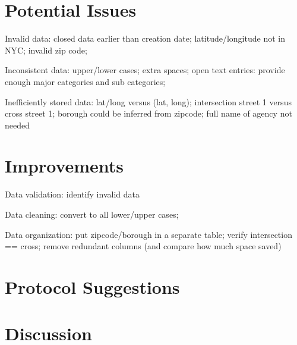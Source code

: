 \documentclass[12pt, titlepage]{article}
\begin{document}
\section{Potential Issues} \label{sec:issues}

Invalid data: closed data earlier than creation date;
latitude/longitude not in NYC; invalid zip code;


Inconsistent data: upper/lower cases; extra spaces; 
open text entries: provide enough major categories and sub categories;


Inefficiently stored data: lat/long versus (lat, long);
intersection street 1 versus cross street 1;
borough could be inferred from zipcode;
full name of agency not needed

\section{Improvements} \label{sec:improve}

Data validation: identify invalid data


Data cleaning: convert to all lower/upper cases;


Data organization: put zipcode/borough in a separate table; verify intersection
== cross; remove redundant columns (and compare how much space saved)


\section{Protocol Suggestions} \label{sec:protocol}



\section{Discussion} \label{sec:disc}




\end{document}

